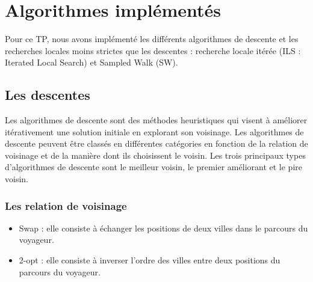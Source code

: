 \section{Algorithmes implémentés}
Pour ce TP, nous avons implémenté les différents algorithmes de descente et les recherches locales moins strictes que les
descentes : recherche locale itérée (ILS : Iterated Local Search) et Sampled Walk (SW).

\subsection{Les descentes}
Les algorithmes de descente sont des méthodes heuristiques qui visent à améliorer itérativement une solution initiale en explorant son voisinage. Les algorithmes de descente peuvent être classés en différentes catégories en fonction de la relation de voisinage et de la manière dont ils choisissent le voisin. Les trois principaux types d'algorithmes de descente sont le meilleur voisin, le premier améliorant et le pire voisin.

\subsubsection{Les relation de voisinage}
\begin{itemize}
	\item Swap : elle consiste à échanger les positions de deux villes dans le parcours du voyageur.
	\item 2-opt : elle  consiste à inverser l'ordre des villes entre deux positions du parcours du voyageur.
\end{itemize}

